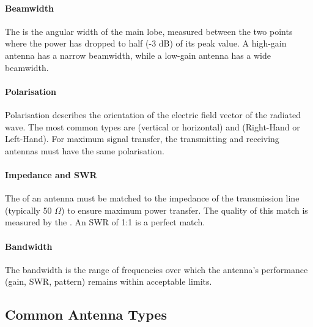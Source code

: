 \paragraph{Beamwidth}
The  is the angular width of the main lobe, measured between the two points where the power has dropped to half (-3 dB) of its peak value. A high-gain antenna has a narrow beamwidth, while a low-gain antenna has a wide beamwidth.

\paragraph{Polarisation}
Polarisation describes the orientation of the electric field vector of the radiated wave. The most common types are  (vertical or horizontal) and  (Right-Hand or Left-Hand). For maximum signal transfer, the transmitting and receiving antennas must have the same polarisation.

\paragraph{Impedance and SWR}
The  of an antenna must be matched to the impedance of the transmission line (typically 50 $\Omega$) to ensure maximum power transfer. The quality of this match is measured by the . An SWR of 1:1 is a perfect match.

\paragraph{Bandwidth}
The bandwidth is the range of frequencies over which the antenna's performance (gain, SWR, pattern) remains within acceptable limits.


\subsection{Common Antenna Types}

